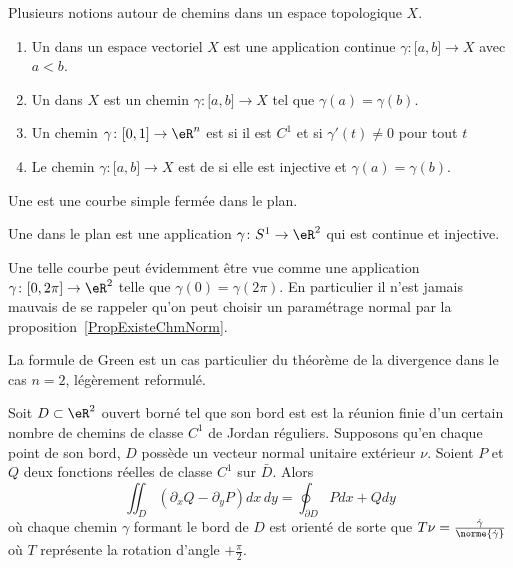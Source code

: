 \begin{definition}       \label{DEFooQZMSooYYkGDv}
    Plusieurs notions autour de chemins dans un espace topologique \( X\).
    \begin{enumerate}
        \item
    Un  dans un espace vectoriel \( X\) est une application continue \( \gamma\colon \mathopen[ a , b \mathclose]\to X\) avec \( a<b\).
        \item
    Un  dans \( X\) est un chemin \( \gamma\colon \mathopen[ a , b \mathclose]\to X\) tel que \( \gamma(a)=\gamma(b)\).
\item
    Un chemin \( \gamma\colon \mathopen[ 0 , 1 \mathclose]\to \eR^n\) est  si il est \( C^1\) et si \( \gamma'(t)\neq 0\) pour tout \( t\)
\item
    Le chemin \( \gamma\colon \mathopen[ a , b \mathclose]\to X\) est de  si elle est injective et \( \gamma(a)=\gamma(b)\).
    \end{enumerate}
\end{definition}

\begin{definition}       \label{DEFooCJCWooLNrHFd}
	Une  est une courbe simple fermée dans le plan.
\end{definition}

\begin{definition}      \label{DEFooBYRDooTBgsui}
	Une  dans le plan est une application \( \gamma\colon S^1\to \eR^2\) qui est continue et injective.
\end{definition}
Une telle courbe peut évidemment être vue comme une application \( \gamma\colon \mathopen[ 0 , 2\pi ]\to \eR^2\) telle que \( \gamma(0)=\gamma(2\pi)\). En particulier il n'est jamais mauvais de se rappeler qu'on peut choisir un paramétrage normal par la proposition~\ref{PropExisteChmNorm}.


La formule de Green est un cas particulier du théorème de la divergence dans le cas \( n = 2\), légèrement reformulé.
\begin{theorem}
	Soit \( D \subset \eR^2\) ouvert borné tel que son bord est est la réunion finie d'un certain nombre de chemins de classe \( C^1\) de Jordan réguliers.  Supposons qu'en chaque point de son bord, \( D\) possède un vecteur normal unitaire extérieur \( \nu\). Soient \( P\) et \( Q\) deux fonctions réelles de classe \( C^1\) sur \( \bar D\). Alors
	\begin{equation}  \label{EqYLblSqV}
		\iint_D (\partial_xQ - \partial_yP)dx\,dy = \oint_{\partial D}
		Pd x + Q d y
	\end{equation}
	où chaque chemin \( \gamma\) formant le bord de \( D\) est orienté de
	sorte que \( T \nu = \frac{\dot\gamma}{\norme{\dot\gamma}}\) où \( T\)
	représente la rotation d'angle \( +\frac\pi2\).
\end{theorem}

